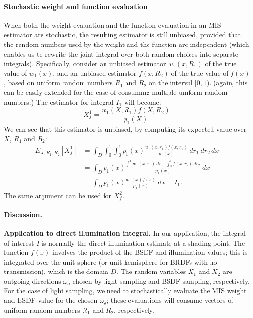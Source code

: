 \paragraph{Stochastic weight and function evaluation}

When both the weight evaluation and the function evaluation in an MIS estimator are stochastic, the resulting estimator is still unbiased, provided that the random numbers used by the weight and the function are independent (which enables us to rewrite the joint integral over both random choices into separate integrals). Specifically, consider an unbiased estimator $w_1(x,R_1)$ of the true value of $w_1(x)$, and an unbiased estimator $f(x,R_2)$ of the true value of $f(x)$, based on uniform random numbers $R_1$ and $R_2$ on the interval $[0,1)$. (again, this can be easily extended for the case of consuming multiple uniform random numbers.) The estimator for integral $I_1$ will become:
\begin{equation}
X_f^1 = \frac{w_1(X,R_1) f(X,R_2)}{p_1(X)}
\end{equation}
We can see that this estimator is unbiased, by computing its expected value over $X$, $R_1$ and $R_2$:
\begin{align}
E_{X,R_1,R_2}[X_f^1] &= \int_D \int_0^1 \int_0^1 p_1(x) \frac{w_1(x,r_1) f(x,r_2)}{p_1(x)} \ dr_1 \ dr_2 \ dx \nonumber \\
					 &= \int_D  p_1(x) \frac{\int_0^1 w_1(x,r_1) \ dr_1 \cdot \int_0^1 f(x,r_2) \ dr_2}{p_1(x)} \ dx \nonumber \\
					 &= \int_D  p_1(x) \frac{w_1(x) f(x)}{p_1(x)} \ dx = I_1.
\end{align}
The same argument can be used for $X_f^2$.


\paragraph{Discussion.}

{\bf Application to direct illumination integral.} In our application, the integral of interest $I$ is normally the direct illumination estimate at a shading point. The function $f(x)$ involves the product of the BSDF and illumination values; this is integrated over the unit sphere (or unit hemisphere for BRDFs with no transmission), which is the domain $D$. The random variables $X_1$ and $X_2$ are outgoing directions $\omega_o$ chosen by light sampling and BSDF sampling, respectively. For the case of light sampling, we need to stochastically evaluate the MIS weight and BSDF value for the chosen $\omega_o$; these evaluations will consume vectors of uniform random numbers $R_1$ and $R_2$, respectively.

